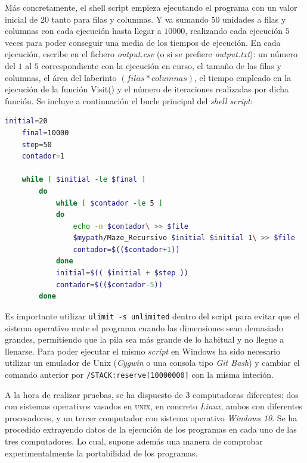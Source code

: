 \documentclass[12pt,a4paper]{article}
\begin{document}
\vspace{0.2cm}
Más concretamente, el shell script empieza ejecutando el programa con un valor inicial de $20$ tanto para filas y columnas. Y va sumando 50 unidades a filas y columnas con cada ejecución hasta llegar a $10000$, realizando cada ejecución $5$ veces para poder conseguir una media de los tiempos de ejecución. En cada ejecución, escribe en el fichero \textit{output.csv} (o si se prefiere \textit{output.txt}): un número del $1$ al $5$ correspondiente con la ejecución en curso, el tamaño de las filas y columnas, el área del laberinto $(filas*columnas)$, el tiempo empleado en la ejecución de la función \textsf{Visit()} y el número de iteraciones realizadas por dicha función. Se incluye a continuación el bucle principal del \textit{shell script}:

\lstset{style=mystyle}
\begin{lstlisting}[language=sh, title= Variente para la función \textsf{PrintGrid()} con carácteres \textsc{unicode}, frame=single, numbers=none]
	initial=20
	final=10000
	step=50
	contador=1
	
	while [ $initial -le $final ]
		do 
			while [ $contador -le 5 ]
			do
				echo -n $contador\ >> $file
				$mypath/Maze_Recursivo $initial $initial 1\ >> $file
				contador=$(($contador+1))
			done
			initial=$(( $initial + $step ))
			contador=$(($contador-5))
		done
\end{lstlisting}
Es importante utilizar \verb|ulimit -s unlimited| dentro del script para evitar que el sistema operativo mate el programa cuando las dimensiones sean demasiado grandes, permitiendo que la pila sea más grande de lo habitual y no llegue a llenarse. Para poder ejecutar el mismo \textit{script} en Windows ha sido necesario utilizar un emulador de Unix (\textit{Cygwin} o una consola tipo \textit{Git Bash}) y cambiar el comando anterior por \verb|/STACK:reserve[10000000]| con la misma inteción.

\vspace{0.2cm}
A la hora de realizar pruebas, se ha dispuesto de 3 computadoras diferentes: dos  con sistemas operativos vasados en \textsc{unix}, en concreto \textit{Linux}, ambos con diferentes procesadores, y un tercer computador con sistema operativo \textit{Windows 10}. Se ha procedido extrayendo datos de la ejecución de los programas en cada uno de las tres computadores. Lo cual, supone además una manera de comprobar experimentalmente la portabilidad de los programas.
\end{document}

